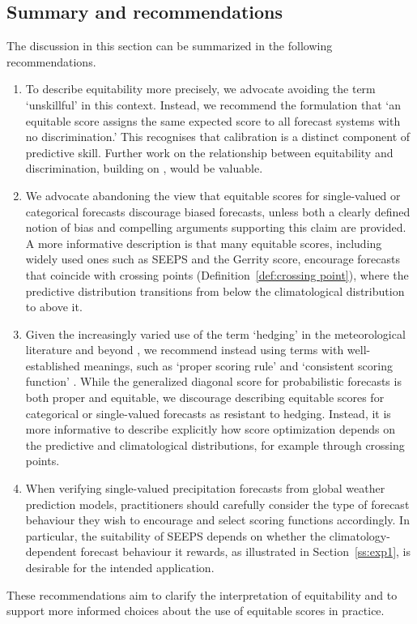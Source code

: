 \documentclass[10pt]{article} %
\theoremstyle{theorem}
\theoremstyle{definition}
\begin{document}
\subsection{Summary and recommendations}\label{ss:summary}

The discussion in this section can be summarized in the following recommendations.
\begin{enumerate}
\item To describe equitability more precisely, we advocate avoiding the term `unskillful' in this context. Instead, we recommend the formulation that `an equitable score assigns the same expected score to all forecast systems with no discrimination.' This recognises that calibration is a distinct component of predictive skill. Further work on the relationship between equitability and discrimination, building on \citet[Appendix~C]{bouallegue2025self}, would be valuable.
\item We advocate abandoning the view that equitable scores for single-valued or categorical forecasts discourage biased forecasts, unless both a clearly defined notion of bias and compelling arguments supporting this claim are provided. A more informative description is that many equitable scores, including widely used ones such as SEEPS and the Gerrity score, encourage forecasts that coincide with crossing points (Definition~\ref{def:crossing point}), where the predictive distribution transitions from below the climatological distribution to above it.
\item Given the increasingly varied use of the term `hedging' in the meteorological literature and beyond \citep{jolliffe2008proper}, we recommend instead using terms with well-established meanings, such as `proper scoring rule' and `consistent scoring function' \citep{murphy1985forecast, gneiting2007strictly, gneiting2011making}. While the generalized diagonal score for probabilistic forecasts is both proper and equitable, we discourage describing equitable scores for categorical or single-valued forecasts as resistant to hedging. Instead, it is more informative to describe explicitly how score optimization depends on the predictive and climatological distributions, for example through crossing points.
\item When verifying single-valued precipitation forecasts from global weather prediction models, practitioners should carefully consider the type of forecast behaviour they wish to encourage and select scoring functions accordingly. In particular, the suitability of SEEPS depends on whether the climatology-dependent forecast behaviour it rewards, as illustrated in Section~\ref{ss:exp1}, is desirable for the intended application.
\end{enumerate}
These recommendations aim to clarify the interpretation of equitability and to support more informed choices about the use of equitable scores in practice.
\end{document}
